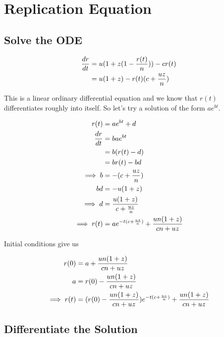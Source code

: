 \documentclass{article}
\begin{document}
\section{Replication Equation}

    \subsection{Solve the ODE}

        \begin{align}
            {dr \over dt} &= u(1+z(1-{r(t) \over n}))-cr(t) \\
                          &= u(1+z)-r(t)(c+{uz \over n})
        \end{align}

        This is a linear ordinary differential equation and we know that $r(t)$ differentiates roughly into itself. So let's try a solution of the form $ae^{bt}$.

        \begin{align}
                     r(t) &= ae^{bt}+d \\
            {dr \over dt} &= bae^{bt} \\
                          &= b(r(t)-d) \\
                          &= br(t)-bd \\
               \implies b &= -(c+{uz \over n}) \\
                       bd &= -u(1+z) \\
               \implies d &= {u(1+z) \over c+{uz \over n}} \\
            \implies r(t) &= ae^{-t(c+{uz \over n})}+{un(1+z) \over cn+uz}
        \end{align}

        Initial conditions give us

        \begin{align}
                     r(0) &= a+{un(1+z) \over cn+uz} \\
                        a &= r(0)-{un(1+z) \over cn+uz} \\
            \implies r(t) &= (r(0)-{un(1+z) \over cn+uz})e^{-t(c+{uz \over n})}+{un(1+z) \over cn+uz}
        \end{align}

    \subsection{Differentiate the Solution}
\end{document}
